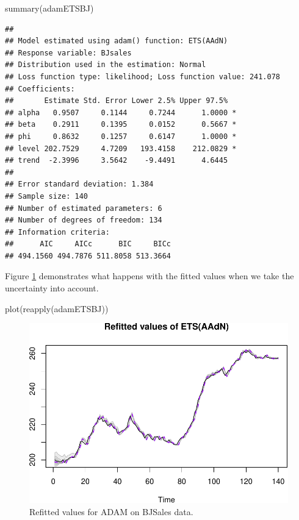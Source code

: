 \documentclass[
]{book}
\newenvironment{Shaded}{\begin{snugshade}}{\end{snugshade}}
\newcommand{\FunctionTok}[1]{\textcolor[rgb]{0.00,0.00,0.00}{#1}}
\newcommand{\NormalTok}[1]{#1}
\theoremstyle{definition}
\theoremstyle{definition}
\theoremstyle{definition}
\theoremstyle{definition}
\theoremstyle{remark}
\begin{document}
\begin{Shaded}
\begin{Highlighting}[]
\FunctionTok{summary}\NormalTok{(adamETSBJ)}
\end{Highlighting}
\end{Shaded}

\begin{verbatim}
## 
## Model estimated using adam() function: ETS(AAdN)
## Response variable: BJsales
## Distribution used in the estimation: Normal
## Loss function type: likelihood; Loss function value: 241.078
## Coefficients:
##       Estimate Std. Error Lower 2.5% Upper 97.5%  
## alpha   0.9507     0.1144     0.7244      1.0000 *
## beta    0.2911     0.1395     0.0152      0.5667 *
## phi     0.8632     0.1257     0.6147      1.0000 *
## level 202.7529     4.7209   193.4158    212.0829 *
## trend  -2.3996     3.5642    -9.4491      4.6445  
## 
## Error standard deviation: 1.384
## Sample size: 140
## Number of estimated parameters: 6
## Number of degrees of freedom: 134
## Information criteria:
##      AIC     AICc      BIC     BICc 
## 494.1560 494.7876 511.8058 513.3664
\end{verbatim}

Figure \ref{fig:adamModelPIRefitted} demonstrates what happens with the fitted values when we take the uncertainty into account.

\begin{Shaded}
\begin{Highlighting}[]
\FunctionTok{plot}\NormalTok{(}\FunctionTok{reapply}\NormalTok{(adamETSBJ))}
\end{Highlighting}
\end{Shaded}

\begin{figure}
\centering
\includegraphics{Svetunkov--2022----ADAM_files/figure-latex/adamModelPIRefitted-1.pdf}
\caption{\label{fig:adamModelPIRefitted}Refitted values for ADAM on BJSales data.}
\end{figure}
\end{document}
